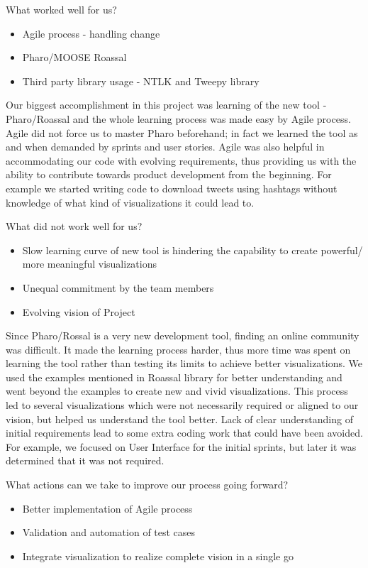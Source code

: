 \documentclass[11pt]{article}
\begin{document}
What worked well for us? 
\begin{itemize}
\item Agile process - handling change
\item Pharo/MOOSE Roassal
\item Third party library usage - NTLK and Tweepy library
\end{itemize}

Our biggest accomplishment in this project was learning of the new tool - Pharo/Roassal and the whole learning process was made easy by Agile process. Agile did not force us to master Pharo beforehand; in fact we learned the tool as and when demanded by sprints and user stories. Agile was also helpful in accommodating our code with evolving requirements, thus providing us with the ability to contribute towards product development from the beginning. For example we started writing code to download tweets using hashtags without knowledge of what kind of visualizations it could lead to.


What did not work well for us? 
\begin{itemize}
\item Slow learning curve of new tool is hindering the capability to create powerful/ more meaningful visualizations
\item Unequal commitment by the team members
\item Evolving vision of Project
\end{itemize}
 
Since Pharo/Rossal is a very new development tool, finding an online community was difficult. It made the learning process harder, thus more time was spent on learning the tool rather than testing its limits to achieve better visualizations. We used the examples mentioned in Roassal library for better understanding and went beyond the examples to create new and vivid visualizations. This process led to several visualizations which were not necessarily required or aligned to our vision, but helped us understand the tool better\cite{GoogleSite}. Lack of clear understanding of initial requirements lead to some extra coding work that could have been avoided. For example, we focused on User Interface for the initial sprints, but later it was determined that it was not required. 

What actions can we take to improve our process going forward? 
\begin{itemize}
\item Better implementation of Agile process 
\item Validation and automation of test cases
\item Integrate visualization to realize complete vision in a single go
\end{itemize}
\end{document}
